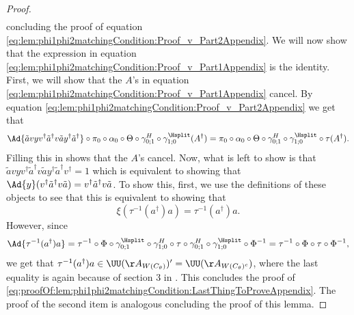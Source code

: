 \begin{proof}
\begin{align}
	\end{align}
	concluding the proof of equation \eqref{eq:lem:phi1phi2matchingCondition:Proof_v_Part2Appendix}. We will now show that the expression in equation \eqref{eq:lem:phi1phi2matchingCondition:Proof_v_Part1Appendix} is the identity. First, we will show that the $A$'s in equation \eqref{eq:lem:phi1phi2matchingCondition:Proof_v_Part1Appendix} cancel. By equation \eqref{eq:lem:phi1phi2matchingCondition:Proof_v_Part2Appendix} we get that
	\begin{equation}
		\Ad{\tilde{a}vyv^\dagger\tilde{a}^\dagger v\tilde{a}y^\dagger\tilde{a}^\dagger}\circ\pi_0\circ\alpha_0\circ\Theta\circ\gamma^{H}_{0;1}\circ\gamma^{\Hsplit}_{1;0}(A^\dagger)=\pi_0\circ\alpha_0\circ\Theta\circ\gamma^{H}_{0;1}\circ\gamma^{\Hsplit}_{1;0}\circ\tau(A^\dagger).
	\end{equation}
	Filling this in shows that the $A$'s cancel. Now, what is left to show is that $\tilde{a}vyv^\dagger\tilde{a}^\dagger v \tilde{a}y^\dagger\tilde{a}^\dagger  v^\dagger=1$ which is equivalent to showing that $\Ad{y}(v^\dagger \tilde{a}^\dagger v \tilde{a})=v^\dagger \tilde{a}^\dagger v \tilde{a}$. To show this, first, we use the definitions of these objects to see that this is equivalent to showing that
	\begin{equation}\label{eq:proofOf:lem:phi1phi2matchingCondition:LastThingToProveAppendix}
		\xi(\tau^{-1}(a^\dagger)a)=\tau^{-1}(a^\dagger)a.
	\end{equation}
	However, since
	\begin{equation}
		\Ad{\tau^{-1}(a^\dagger)a}=\tau^{-1}\circ\Phi\circ\gamma^{\Hsplit}_{0;1}\circ\gamma^H_{1;0}\circ\tau\circ\gamma^H_{0;1}\circ\gamma^{\Hsplit}_{1;0}\circ\Phi^{-1}=\tau^{-1}\circ\Phi\circ\tau\circ\Phi^{-1},
	\end{equation}
	we get that $\tau^{-1}(a^\dagger)a\in\UU(\AA_{W(C_\theta)})'=\UU(\AA_{W(C_\theta)^c})$, where the last equality is again because of section 3 in \cite{NaScWe_2013}. This concludes the proof of \ref{eq:proofOf:lem:phi1phi2matchingCondition:LastThingToProveAppendix}. The proof of the second item is analogous concluding the proof of this lemma.
\end{proof}
